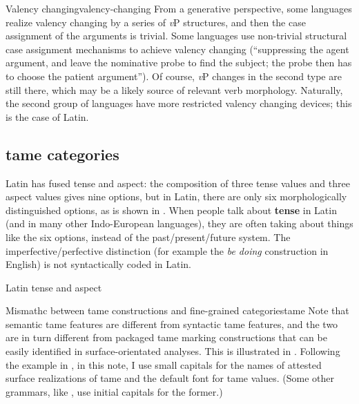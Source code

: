 \documentclass[a4paper, oneside]{report}
\newcommand*{\concept}[1]{\textbf{#1}}
\newcommand{\corpus}[1]{\emph{#1}}
\newcommand{\vP}{\textit{v}P}
\begin{document}
\begin{theorybox}{Valency changing}{valency-changing}
    From a generative perspective, some languages realize valency changing 
    by a series of \vP{} structures, and then the case assignment of the arguments is trivial.
    Some languages use non-trivial structural case assignment mechanisms
    to achieve valency changing 
    (``suppressing the agent argument, 
    and leave the nominative probe to find the subject;
    the probe then has to choose the patient argument'').
    Of course, \vP{} changes in the second type are still there,
    which may be a likely source of relevant verb morphology.
    Naturally, the second group of languages have more restricted valency changing devices;
    this is the case of Latin.
\end{theorybox}

\subsection{\acs{tame} categories}\label{sec:verb-inflection.finite-template.tame}

Latin has fused tense and aspect:
the composition of three tense values and three aspect values 
gives nine options,
but in Latin, there are only six morphologically distinguished options,
as is shown in . 
When people talk about \concept{tense} in Latin (and in many other Indo-European languages),
they are often taking about things like the six options,
instead of the past/present/future system.
The imperfective/perfective distinction 
(for example the \corpus{be doing} construction in English)
is not syntactically coded in Latin.

\begin{table}[H]
    \caption{Latin tense and aspect}
    \label{tbl:latin-tense-aspect}
    \centering
        
\end{table}

\begin{infobox}{Mismathc between \ac{tame} constructions and fine-grained categories}{tame}
    Note that semantic \ac{tame} features are different from 
    syntactic \ac{tame} features,
    and the two are in turn different from packaged \ac{tame} marking constructions
    that can be easily identified in surface-orientated analyses.
    This is illustrated in .
    Following the example in \citet{grimm2021grammar},
    in this note, I use small capitals for the names of attested surface realizations of \ac{tame}
    and the default font for \ac{tame} values.
    (Some other grammars, like \citet{jacques2021grammar,friesen2017grammar}, 
    use initial capitals for the former.)
\end{infobox}
\end{document}

